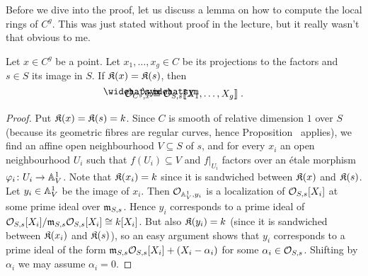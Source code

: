 \documentclass[a4paper,parskip=half,numbers=enddot, DIV=12]{scrreprt}
\begin{document}
Before we dive into the proof, let us discuss a lemma on how to compute the local rings of $C^g$. This was just stated without proof in the lecture, but it really wasn't that obvious to me.
\begin{lem}
	Let $x\in C^g$ be a point. Let $x_1,\ldots,x_g\in C$ be its projections to the factors and $s\in S$ its image in $S$. If $\mathfrak{K}(x)=\mathfrak{K}(s)$, then
	\begin{align*}
		\roof{\Oo}_{C^g,x}\cong \roof{\Oo}_{S,s}\llbracket X_1,\ldots,X_g\rrbracket\;.
	\end{align*}
\end{lem}
\begin{proof}
	Put $\mathfrak{K}(x)=\mathfrak{K}(s)=k$. Since $C$ is smooth of relative dimension $1$ over $S$ (because its geometric fibres are regular curves, hence Proposition~ applies), we find an affine open neighbourhood $V\subseteq S$ of $s$, and for every $x_i$ an open neighbourhood $U_i$ such that $f(U_i)\subseteq V$ and $f|_{U_i}$ factors over an étale morphism $\phi_i\colon U_i\morphism\IA_V^1$. Note that $\mathfrak{K}(x_i)=k$ since it is sandwiched between $\mathfrak{K}(x)$ and $\mathfrak{K}(s)$. Let $y_i\in \mathbb{A}_V^1$ be the image of $x_i$. Then $\mathcal{O}_{\mathbb{A}_V^1,y_i}$ is a localization of $\mathcal{O}_{S,s}[X_i]$ at some prime ideal over $\mathfrak{m}_{S,s}$. Hence $y_i$ corresponds to a prime ideal of $\mathcal{O}_{S,s}[X_i]/\mathfrak{m}_{S,s}\mathcal{O}_{S,s}[X_i]\cong k[X_i]$. But also $\mathfrak{K}(y_i)=k$ (since it is sandwiched between $\mathfrak{K}(x_i)$ and $\mathfrak{K}(s)$), so an easy argument shows that $y_i$ corresponds to a prime ideal of the form $\mathfrak{m}_{S,s}\mathcal{O}_{S,s}[X_i]+(X_i-\alpha_i)$ for some $\alpha_i\in\mathcal{O}_{S,s}$. Shifting by $\alpha_i$ we may assume $\alpha_i=0$.
	

\end{proof}
\end{document}
